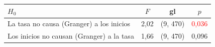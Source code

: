 \begin{tabular}{lccc}
\toprule
$H_0$ & $F$ & gl & $p$
\\ \midrule
La tasa no causa (Granger) a los inicios & 2{,}02 & (9, 470) & \textcolor{red}{0{,}036} \\
Los inicios no causan (Granger) a la tasa & 1{,}66 & (9, 470) & 0{,}096 \\
\bottomrule
\end{tabular}

